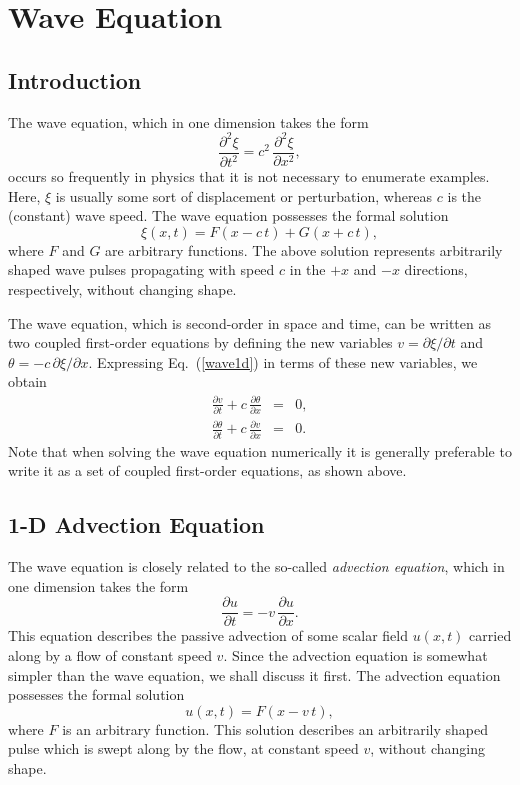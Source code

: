 \chapter{Wave Equation}
\section{Introduction}
The wave equation, which in one dimension takes the form
\begin{equation}\label{wave1d}
\frac{\partial^2\xi}{\partial t^2} = c^2\,\frac{\partial^2 \xi}{\partial x^2},
\end{equation}
occurs so frequently in physics that it is not necessary to enumerate examples.
Here, $\xi$ is usually some sort of displacement or perturbation, whereas $c$ is the
(constant) wave speed. The wave equation possesses the formal solution
\begin{equation}
\xi(x,t) = F(x-c\,t) + G(x+c\,t),
\end{equation}
where $F$ and $G$ are arbitrary functions. The above solution  represents arbitrarily
shaped wave pulses propagating  with speed $c$ in the $+x$ and $-x$ directions, respectively, without
changing shape.

The wave equation, which is second-order in space and time,
 can be written as two coupled first-order  equations
by defining the new variables $v=\partial\xi/\partial t$ and $\theta=-c\,\partial\xi/\partial x$.
Expressing Eq.~(\ref{wave1d}) in terms of these new variables, we obtain
\begin{eqnarray}
\frac{\partial v}{\partial t} + c\,\frac{\partial \theta}{\partial x} &=& 0,\\[0.5ex]
\frac{\partial \theta}{\partial t} + c\,\frac{\partial v}{\partial x} &=& 0.
\end{eqnarray}
Note that when solving the wave equation numerically it is generally preferable to write it
as a set of coupled first-order equations, as shown above.

\section{1-D Advection Equation}
The wave equation is closely related to the so-called {\em advection equation}, which
in one dimension takes the form
\begin{equation}\label{advection}
\frac{\partial u}{\partial t} = -v\,\frac{\partial u}{\partial x}.
\end{equation}
This equation describes the passive advection of some scalar field $u(x,t)$
carried along by a flow of constant speed $v$. Since the advection equation
is somewhat simpler than the wave equation, we shall discuss it first.
The advection equation
possesses the formal solution
\begin{equation}
u(x,t) = F(x-v\,t),
\end{equation}
where $F$ is an arbitrary function. This solution describes an  arbitrarily
shaped pulse which is swept along by the flow, at constant speed $v$, without
changing shape. 

